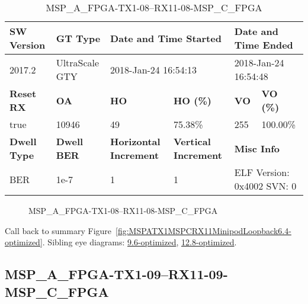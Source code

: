 \begin{table}[h]
\centering
\caption{MSP\_A\_FPGA-TX1-08--RX11-08-MSP\_C\_FPGA}
\label{tab:MSPAFPGATX108RX1108MSPCFPGA6.4-optimized}
\begin{tabular}{@{}|l|l|l|l|l|l|@{}}
\toprule
\textbf{SW Version}                & \textbf{GT Type}   & \multicolumn{2}{l|}{\textbf{Date and Time Started}}            & \multicolumn{2}{l|}{\textbf{Date and Time Ended}}        \\ \midrule
2017.2                       & UltraScale GTY          & \multicolumn{2}{l|}{2018-Jan-24 16:54:13}                   & \multicolumn{2}{l|}{2018-Jan-24 16:54:48}               \\ \midrule
\textbf{Reset RX}                  & \textbf{OA} & \textbf{HO}   & \textbf{HO (\%)} & \textbf{VO} & \textbf{VO (\%)} \\ \midrule
true & 10946        & 49          & 75.38\%        & 255        & 100.00\%       \\ \midrule
\textbf{Dwell Type}                & \textbf{Dwell BER} & \textbf{Horizontal Increment} & \textbf{Vertical Increment}    & \multicolumn{2}{l|}{\textbf{Misc Info}}                  \\ \midrule
BER                            & 1e-7        & 1        & 1           & \multicolumn{2}{l|}{ELF Version: 0x4002 SVN: 0}                         \\ \bottomrule
\end{tabular}
\end{table}

\begin{figure}[h]
\caption{MSP\_A\_FPGA-TX1-08--RX11-08-MSP\_C\_FPGA} \label{fig:MSPAFPGATX108RX1108MSPCFPGA6.4-optimized}
\end{figure}

Call back to summary Figure~\ref{fig:MSPATX1MSPCRX11MinipodLoopback6.4-optimized}.
Sibling eye diagrams: \hyperref[sec:MSPAFPGATX108RX1108MSPCFPGA9.6-optimized]{9.6-optimized}, \hyperref[sec:MSPAFPGATX108RX1108MSPCFPGA12.8-optimized]{12.8-optimized}.

\clearpage
\newpage


\subsection{MSP\_A\_FPGA-TX1-09--RX11-09-MSP\_C\_FPGA}\label{sec:MSPAFPGATX109RX1109MSPCFPGA6.4-optimized}


